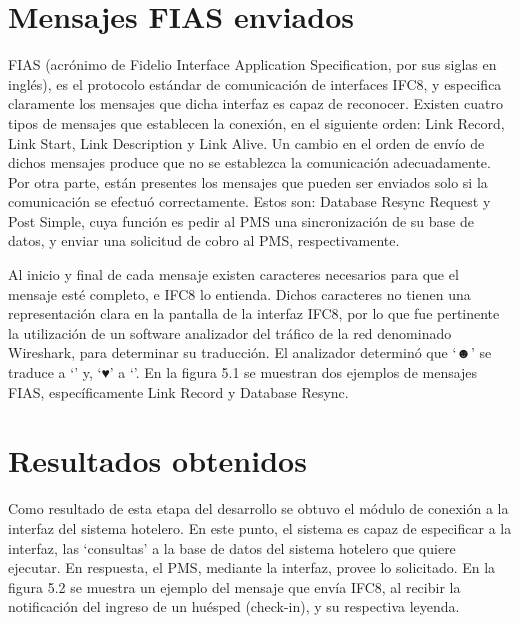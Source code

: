 \section{Mensajes FIAS enviados}
		FIAS (acrónimo de Fidelio Interface Application Specification, por sus siglas en inglés), es el protocolo estándar de comunicación de interfaces IFC8, y especifica claramente los mensajes que dicha interfaz es capaz de reconocer. Existen cuatro tipos de mensajes que establecen la conexión, en el siguiente orden: Link Record, Link Start, Link Description y Link Alive. Un cambio en el orden de envío de dichos mensajes produce que no se establezca la comunicación adecuadamente. Por otra parte, están presentes los mensajes que pueden ser enviados solo si la comunicación se efectuó correctamente. Estos son: Database Resync Request y Post Simple, cuya función es pedir al PMS una sincronización de su base de datos, y enviar una solicitud de cobro al PMS, respectivamente.
		
		Al inicio y final de cada mensaje existen caracteres necesarios para que el mensaje esté completo, e IFC8 lo entienda. Dichos caracteres no tienen una representación clara en la pantalla de la interfaz IFC8, por lo que fue pertinente la utilización de un software analizador del tráfico de la red denominado Wireshark, para determinar su traducción. El analizador determinó que ‘☻’ se traduce a ‘’ y, ‘♥’ a ‘’. En la figura 5.1 se muestran dos ejemplos de mensajes FIAS, específicamente Link Record y Database Resync.


\section{Resultados obtenidos}
		Como resultado de esta etapa del desarrollo se obtuvo el módulo de conexión a la interfaz del sistema hotelero. En este punto, el sistema es capaz de especificar a la interfaz, las ‘consultas’ a la base de datos del sistema hotelero que quiere ejecutar. En respuesta, el PMS, mediante la interfaz, provee lo solicitado. En la figura 5.2 se muestra un ejemplo del mensaje que envía IFC8, al recibir la notificación del ingreso de un huésped (check-in), y su respectiva leyenda.
